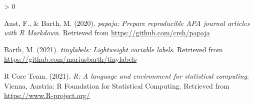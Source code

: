 \documentclass[
  english,
  man]{apa6}
\newlength{\cslhangindent}
\newenvironment{CSLReferences}[2] %
 {%
  \setlength{\parindent}{0pt}
  \ifodd #1 \everypar{\setlength{\hangindent}{\cslhangindent}}\ignorespaces\fi
  \ifnum #2 > 0
  \setlength{\parskip}{#2\baselineskip}
  \fi
 }%
 {}
\begin{document}
\begingroup
\setlength{\parindent}{-0.5in}
\setlength{\leftskip}{0.5in}

\hypertarget{refs}{}
\begin{CSLReferences}{1}{0}
\leavevmode\hypertarget{ref-R-papaja}{}%
Aust, F., \& Barth, M. (2020). \emph{{papaja}: {Prepare} reproducible {APA} journal articles with {R Markdown}}. Retrieved from \url{https://github.com/crsh/papaja}

\leavevmode\hypertarget{ref-R-tinylabels}{}%
Barth, M. (2021). \emph{{tinylabels}: Lightweight variable labels}. Retrieved from \url{https://github.com/mariusbarth/tinylabels}

\leavevmode\hypertarget{ref-R-base}{}%
R Core Team. (2021). \emph{R: A language and environment for statistical computing}. Vienna, Austria: R Foundation for Statistical Computing. Retrieved from \url{https://www.R-project.org/}

\end{CSLReferences}

\endgroup
\end{document}
